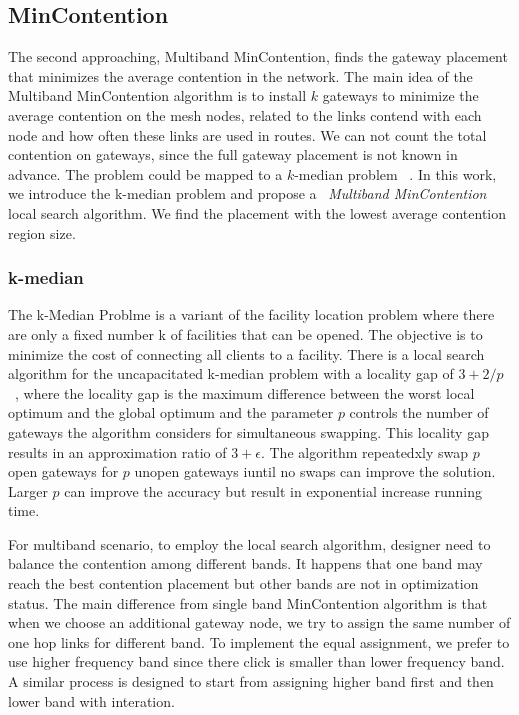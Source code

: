 


\subsection{MinContention}
\label{subsec:mincontention}

The second approaching, Multiband MinContention, finds the gateway placement that minimizes the average contention in the network.
The main idea of the Multiband MinContention algorithm is to install $k$ gateways to minimize the average contention on the mesh nodes, related to the links contend with each node and how often these links are used in routes.
We can not count the total contention on gateways, since the full gateway placement is not known in advance.
The problem could be mapped to a $k$-median problem ~\cite{robinson2008adding}.
In this work, we introduce the k-median problem and propose a ~\emph{Multiband MinContention} local search algorithm. We find the placement with the lowest average contention region size.

\subsubsection{k-median}
The k-Median Problme is a variant of the facility location problem where there are only a fixed number k of facilities that can be opened. The objective is to minimize the cost of connecting all clients to a facility. 
There is a local search algorithm for the uncapacitated k-median problem with a locality gap of $3+2/p$ ~\cite{arya2004local},
where the locality gap is the maximum difference between the worst local optimum and the global optimum and the parameter $p$ controls the number of gateways the algorithm considers for simultaneous swapping. 
This locality gap results in an approximation ratio of $3+\epsilon$. The algorithm repeatedxly swap $p$ open gateways for $p$ unopen gateways iuntil no swaps can improve the solution. Larger $p$ can improve the accuracy but result in exponential increase running time.

For multiband scenario, to employ the local search algorithm, designer need to balance the contention among different bands. It happens that one band may reach the best contention placement but other bands are not in optimization status. The main difference from single band MinContention algorithm is that when we choose an additional gateway node, we try to assign the same number of one hop links for different band. To implement the equal assignment, we prefer to use higher frequency band since there click is smaller than lower frequency band. A similar process is designed to start from assigning higher band first and then lower band with interation.

